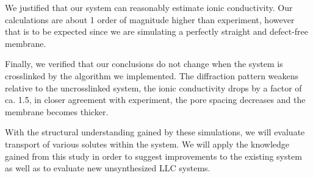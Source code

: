 \documentclass{article}
\begin{document}
  We justified that our system can reasonably estimate ionic conductivity.  Our
  calculations are about 1 order of magnitude higher than experiment, however
  that is to be expected since we are simulating a perfectly straight and
  defect-free membrane. 

  Finally, we verified that our conclusions do not change when the system is
  crosslinked by the algorithm we implemented. The diffraction pattern weakens
  relative to the uncrosslinked system, the ionic conductivity drops by a factor
  of ca. 1.5, in closer agreement with experiment, the pore spacing decreases and
  the membrane becomes thicker. 

  With the structural understanding gained by these simulations, we will
  evaluate transport of various solutes within the system. We will apply the
  knowledge gained from this study in order to suggest improvements to the
  existing system as well as to evaluate new unsynthesized LLC systems.

  \clearpage
  
\end{document}
